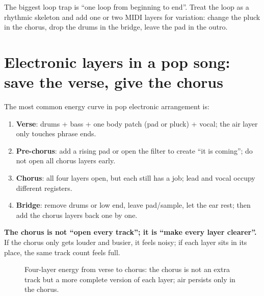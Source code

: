 The biggest loop trap is ``one loop from beginning to end''. Treat the loop as a rhythmic skeleton and add one or two MIDI layers for variation: change the pluck in the chorus, drop the drums in the bridge, leave the pad in the outro.

\section{Electronic layers in a pop song: save the verse, give the chorus}
\label{sec:pop-layers}

The most common energy curve in pop electronic arrangement is:

\begin{enumerate}
\item \textbf{Verse}: drums + bass + one body patch (pad or pluck) + vocal; the air layer only touches phrase ends.
\item \textbf{Pre-chorus}: add a rising pad or open the filter to create ``it is coming''; do not open all chorus layers early.
\item \textbf{Chorus}: all four layers open, but each still has a job; lead and vocal occupy different registers.
\item \textbf{Bridge}: remove drums or low end, leave pad/sample, let the ear rest; then add the chorus layers back one by one.
\end{enumerate}

\textbf{The chorus is not ``open every track''; it is ``make every layer clearer''.} If the chorus only gets louder and busier, it feels noisy; if each layer sits in its place, the same track count feels full.

\begin{figure}[htbp]
  \centering
  \caption{Four-layer energy from verse to chorus: the chorus is not an extra track but a more complete version of each layer; air persists only in the chorus.}
  \label{fig:electronic-layers}
\end{figure}

